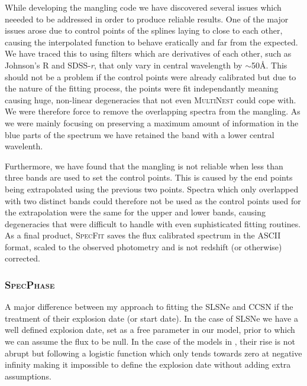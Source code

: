While developing the mangling code we have discovered several issues which neeeded to be addressed in order to produce reliable results. One of the major issues arose due to control points of the splines laying to close to each other, causing the interpolated function to behave eratically and far from the expected. We have traced this to using filters which are derivatives of each other, such as Johnson's R and SDSS-\textit{r}, that only vary in central wavelength by $\sim$50\AA. This should not be a problem if the control points were already calibrated but due to the nature of the fitting process, the points were fit independantly meaning causing huge, non-linear degeneracies that not even \textsc{MultiNest} could cope with. We were therefore force to remove the overlapping spectra from the mangling. As we were mainly focusing on preserving a maximum amount of information in the blue parts of the spectrum we have retained the band with a lower central wavelenth.

Furthermore, we have found that the mangling is not reliable when less than three bands are used to set the control points. This is caused by the end points being extrapolated using the previous two points. Spectra which only overlapped with two distinct bands could therefore not be used as the control points used for the extrapolation were the same for the upper and lower bands, causing degeneracies that were difficult to handle with even suphisticated fitting routines. As a final product, \textsc{SpecFit} saves the flux calibrated spectrum in the ASCII format, scaled to the observed photometry and is not redshift (or otherwise) corrected.

\subsubsection{\textsc{SpecPhase}}
A major difference between my approach to fitting the SLSNe and CCSN if the treatment of their explosion date (or start date). In the case of SLSNe we have a well defined explosion date, set as a free parameter in our model, prior to which we can assume the flux to be null. In the case of the models in , their rise is not abrupt but following a logistic function which only tends towards zero at negative infinity making it impossible to define the explosion date without adding extra assumptions.

